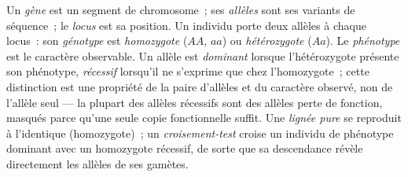 \begin{definition}\label{def:b2:meiosis-heredity:vocabulary}
Un \emph{gène} est un segment de chromosome~; ses \emph{allèles} sont
ses variants de séquence~; le \emph{locus} est sa position. Un individu
 porte deux allèles à chaque locus~: son \emph{génotype}
est \emph{homozygote} ($AA$, $aa$) ou \emph{hétérozygote} ($Aa$).
Le \emph{phénotype} est le caractère observable. Un allèle est
\emph{dominant} lorsque l'hétérozygote présente son phénotype,
\emph{récessif} lorsqu'il ne s'exprime que chez l'homozygote~; cette
distinction est une propriété de la paire d'allèles et du caractère
observé, non de l'allèle seul --- la plupart des allèles récessifs sont
des allèles perte de fonction, masqués parce qu'une seule copie
fonctionnelle suffit. Une \emph{lignée pure} se reproduit à l'identique
(homozygote)~; un \emph{croisement-test} croise un individu de phénotype
dominant avec un homozygote récessif, de sorte que sa descendance révèle
directement les allèles de ses gamètes.
\end{definition}

